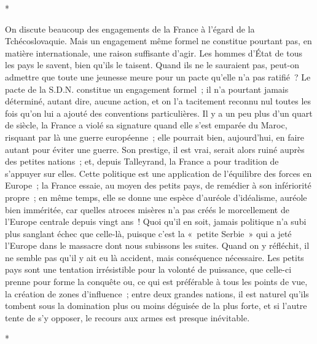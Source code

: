 \documentclass[french,twoside]{book} %
\begin{document}
\begin{center}
\noindent \centerline{*}\par
\end{center}

\noindent On discute beaucoup des engagements de la France à l'égard de la Tchécoslovaquie. Mais un engagement même formel ne constitue pourtant pas, en matière internationale, une raison suffisante d'agir. Les hommes d'État de tous les pays le savent, bien qu'ils le taisent. Quand ils ne le sauraient pas, peut-on admettre que toute une jeunesse meure pour un pacte qu'elle n'a pas ratifié ? Le pacte de la S.D.N. constitue un engagement formel ; il n'a pourtant jamais déterminé, autant dire, aucune action, et on l'a tacitement reconnu nul toutes les fois qu'on lui a ajouté des conventions particulières. Il y a un peu plus d'un quart de siècle, la France a violé sa signature quand elle s'est emparée du Maroc, risquant par là une guerre européenne ; elle pourrait bien, aujourd'hui, en faire autant pour éviter une guerre. Son prestige, il est vrai, serait alors ruiné auprès des petites nations ; et, depuis Talleyrand, la France a pour tradition de s'appuyer sur elles. Cette politique est une application de l'équilibre des forces en Europe ; la France essaie, au moyen des petits pays, de remédier à son infériorité propre ; en même temps, elle se donne une espèce d'auréole d'idéalisme, auréole bien imméritée, car quelles atroces misères n'a pas créés le morcellement de l'Europe centrale depuis vingt ans ! Quoi qu'il en soit, jamais politique n'a subi plus sanglant échec que celle-là, puisque c'est la « petite Serbie » qui a jeté l'Europe dans le massacre dont nous subissons les suites. Quand on y réfléchit, il ne semble pas qu'il y ait eu là accident, mais conséquence nécessaire. Les petits pays sont une tentation irrésistible pour la volonté de puissance, que celle-ci prenne pour forme la conquête ou, ce qui est préférable à tous les points de vue, la création de zones d'influence ; entre deux grandes nations, il est naturel qu'ils tombent sous la domination plus ou moins déguisée de la plus forte, et si l'autre tente de s'y opposer, le recours aux armes est presque inévitable.\par

\begin{center}
\noindent \centerline{*}\par
\end{center}
\end{document}
